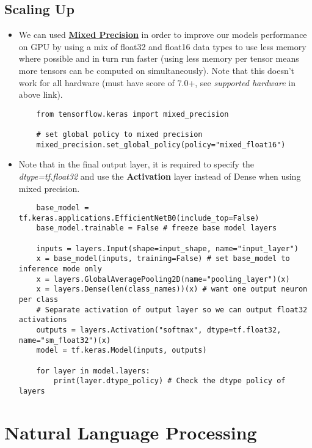 \documentclass[11pt, a4paper]{article}
\begin{document}
	\subsection{Scaling Up}
	\begin{itemize}
		\item We can used \href{https://www.tensorflow.org/guide/mixed_precision}{\textbf{Mixed Precision}} in order to improve our models performance on GPU by using a mix of float32 and float16 data types to use less memory where possible and in turn run faster (using less memory per tensor means more tensors can be computed on simultaneously). Note that this doesn't work for all hardware (must have score of 7.0+, see \textit{supported hardware} in above link).
	\begin{lstlisting}
	from tensorflow.keras import mixed_precision
	
	# set global policy to mixed precision
	mixed_precision.set_global_policy(policy="mixed_float16") \end{lstlisting}
		\item Note that in the final output layer, it is required to specify the \textit{dtype=tf.float32} and use the \textbf{Activation} layer instead of Dense when using mixed precision.
	\begin{lstlisting}
	base_model = tf.keras.applications.EfficientNetB0(include_top=False)
	base_model.trainable = False # freeze base model layers

	inputs = layers.Input(shape=input_shape, name="input_layer")
	x = base_model(inputs, training=False) # set base_model to inference mode only
	x = layers.GlobalAveragePooling2D(name="pooling_layer")(x)
	x = layers.Dense(len(class_names))(x) # want one output neuron per class 
	# Separate activation of output layer so we can output float32 activations
	outputs = layers.Activation("softmax", dtype=tf.float32, name="sm_float32")(x) 
	model = tf.keras.Model(inputs, outputs)	

	for layer in model.layers:
		print(layer.dtype_policy) # Check the dtype policy of layers\end{lstlisting}
	\end{itemize} \newpage


	\section{Natural Language Processing}
	
	
	
	
	
	
\end{document}
